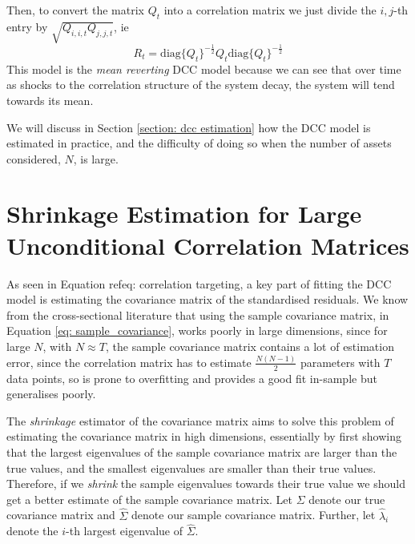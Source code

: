 \documentclass{article} %
\numberwithin{equation}{section} %
\numberwithin{figure}{section} %
\numberwithin{table}{section} %
\begin{document}
Then, to convert the matrix $Q_t$ into a correlation matrix we just divide the $i,j$-th entry by $\sqrt{Q_{i,i,t}Q_{j,j,t}}$, ie
\begin{equation}
  R_t = \text{diag}\{Q_t\}^{-\frac{1}{2}} Q_t \text{diag}\{Q_t\}^{-\frac{1}{2}}
\end{equation}
This model is the \textit{mean reverting} DCC model because we can see that over time as shocks to the correlation structure of the system decay, the system will tend towards its mean.

We will discuss in Section \ref{section: dcc estimation} how the DCC model is estimated in practice, and the difficulty of doing so when the number of assets considered, $N$, is large.


\section{Shrinkage Estimation for Large Unconditional Correlation Matrices}\label{section: shrinkage}

As seen in Equation ref{eq: correlation targeting}, a key part of fitting the DCC model is estimating the covariance matrix of the standardised residuals. We know from the cross-sectional literature that using the sample covariance matrix, in Equation \ref{eq: sample_covariance}, works poorly in large dimensions, since for large $N$, with $N \approx T$, the sample covariance matrix contains a lot of estimation error, since the correlation matrix has to estimate $\frac{N(N-1)}{2}$ parameters with $T$ data points, so is prone to overfitting and provides a good fit in-sample but generalises poorly.

 The \textit{shrinkage} estimator of the covariance matrix aims to solve this problem of estimating the covariance matrix in high dimensions, essentially by first showing that the largest eigenvalues of the sample covariance matrix are larger than the true values, and the smallest eigenvalues are smaller than their true values. Therefore, if we \textit{shrink} the sample eigenvalues towards their true value we should get a better estimate of the sample covariance matrix. Let $\Sigma$ denote our true covariance matrix and $\hat{\Sigma}$ denote our sample covariance matrix. Further, let $\hat{\lambda}_i$ denote the $i$-th largest eigenvalue of $\hat{\Sigma}$.
\end{document}
